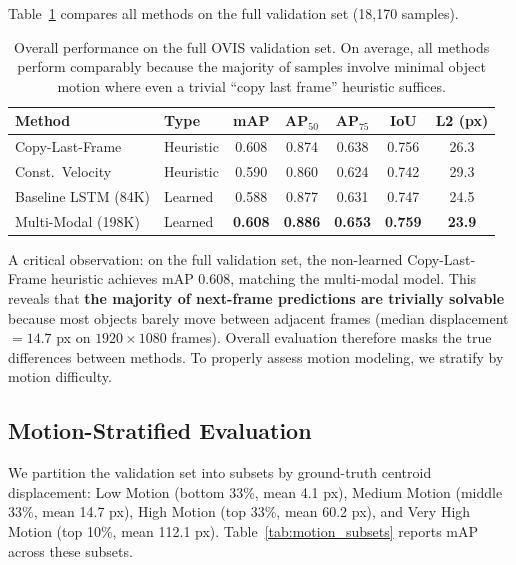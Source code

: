\documentclass{article}
\begin{document}
Table~\ref{tab:main_results} compares all methods on the full validation set (18,170 samples).

\begin{table}[h]
\centering
\begin{tabular}{llccccc}
\toprule
Method & Type & mAP & AP$_{50}$ & AP$_{75}$ & IoU & L2 (px) \\
\midrule
Copy-Last-Frame & Heuristic & 0.608 & 0.874 & 0.638 & 0.756 & 26.3 \\
Const.\ Velocity & Heuristic & 0.590 & 0.860 & 0.624 & 0.742 & 29.3 \\
Baseline LSTM (84K) & Learned & 0.588 & 0.877 & 0.631 & 0.747 & 24.5 \\
Multi-Modal (198K) & Learned & \textbf{0.608} & \textbf{0.886} & \textbf{0.653} & \textbf{0.759} & \textbf{23.9} \\
\bottomrule
\end{tabular}
\caption{Overall performance on the full OVIS validation set. On average, all methods perform comparably because the majority of samples involve minimal object motion where even a trivial ``copy last frame'' heuristic suffices.}
\label{tab:main_results}
\end{table}

A critical observation: on the full validation set, the non-learned Copy-Last-Frame heuristic achieves mAP 0.608, matching the multi-modal model. This reveals that \textbf{the majority of next-frame predictions are trivially solvable} because most objects barely move between adjacent frames (median displacement $= 14.7$ px on $1920 \times 1080$ frames). Overall evaluation therefore masks the true differences between methods. To properly assess motion modeling, we stratify by motion difficulty.

\subsection{Motion-Stratified Evaluation}

We partition the validation set into subsets by ground-truth centroid displacement: Low Motion (bottom 33\%, mean 4.1 px), Medium Motion (middle 33\%, mean 14.7 px), High Motion (top 33\%, mean 60.2 px), and Very High Motion (top 10\%, mean 112.1 px). Table~\ref{tab:motion_subsets} reports mAP across these subsets.
\end{document}
